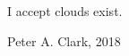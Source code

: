 \pagestyle{empty}

\renewcommand{\epigraphflush}{center}
\vspace*{60mm}
\epigraph{I accept clouds exist.}{Peter A. Clark, 2018\nocite{pcomm:ClarkClouds2018}}

\cleardoublepage